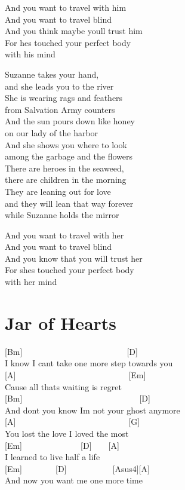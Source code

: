 \documentclass[
  letterpaper,
  a5paper]{memoir}
\begin{document}
And you want to travel with him\\
And you want to travel blind\\
And you think maybe you\textquotesingle ll trust him\\
For he\textquotesingle s touched your perfect body\\
with his mind

Suzanne takes your hand,\\
and she leads you to the river~~~\\
She is wearing rags and feathers\\
from Salvation Army counters\\
And the sun pours down like honey\\
on our lady of the harbor\\
And she shows you where to look\\
among the garbage and the flowers\\
There are heroes in the seaweed,\\
there are children in the morning~~~~\\
They are leaning out for love\\
and they will lean that way forever~~~\\
while Suzanne holds the mirror

And you want to travel with her\\
And you want to travel blind\\
And you know that you will trust her\\
For she\textquotesingle s touched your perfect body\\
with her mind

\hypertarget{jar-of-hearts}{%
\chapter{Jar of Hearts}\label{jar-of-hearts}}

{[}Bm{]}~~~~~~~~~~~~~~~~~~~~~~~~~{[}D{]}\\
I know I can\textquotesingle t take one more step towards you\\
{[}A{]}~~~~~~~~~~~~~~~~~~~~~~~~~~~{[}Em{]}\\
\textquotesingle Cause all thats waiting is regret\\
{[}Bm{]}~~~~~~~~~~~~~~~~~~~~~~~~~~~~{[}D{]}\\
And don\textquotesingle t you know I\textquotesingle m not your ghost
anymore\\
{[}A{]}~~~~~~~~~~~~~~~~~~~~~~~~~~~{[}G{]}\\
You lost the love I loved the most\\
{[}Em{]}~~~~~~~~~~~~~~{[}D{]}~~~~{[}A{]}\\
I learned to live half a life\\
{[}Em{]}~~~~~~~~{[}D{]}~~~~~~~~~~~{[}Asus4{]}{[}A{]}\\
And now you want me one more time
\end{document}
